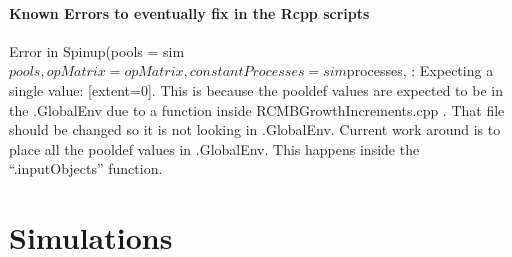 \documentclass[]{article}
\let\oldparagraph\paragraph
\renewcommand{\paragraph}[1]{\oldparagraph{#1}\mbox{}}
\begin{document}
\paragraph{Known Errors to eventually fix in the Rcpp
scripts}\label{known-errors-to-eventually-fix-in-the-rcpp-scripts}

Error in Spinup(pools =
sim\(pools, opMatrix = opMatrix, constantProcesses = sim\)processes, :
Expecting a single value: {[}extent=0{]}. This is because the pooldef
values are expected to be in the .GlobalEnv due to a function inside
RCMBGrowthIncrements.cpp . That file should be changed so it is not
looking in .GlobalEnv. Current work around is to place all the pooldef
values in .GlobalEnv. This happens inside the ``.inputObjects''
function.

\section{Simulations}\label{simulations}
\end{document}
